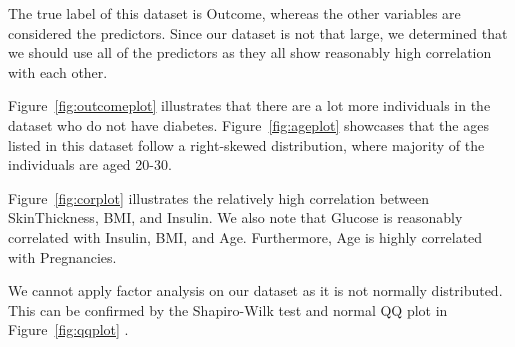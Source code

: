 \documentclass[12pt]{article}
\begin{document}
\begin{indent}
\onehalfspacing	
	
The true label of this dataset is Outcome, whereas the other variables are considered the predictors. Since our dataset is not that large, we determined that we should use all of the predictors as they all show reasonably high correlation with each other. 

Figure~\ref{fig:outcomeplot} illustrates that there are a lot more individuals in the dataset who do not have diabetes. Figure~\ref{fig:ageplot} showcases that the ages listed in this dataset follow a right-skewed distribution, where majority of the individuals are aged 20-30.

Figure~\ref{fig:corplot} illustrates the relatively high correlation between SkinThickness, BMI, and Insulin. We also note that Glucose is reasonably correlated with Insulin, BMI, and Age. Furthermore, Age is highly correlated with Pregnancies.

We cannot apply factor analysis on our dataset as it is not normally distributed. This can be confirmed by the Shapiro-Wilk test and normal QQ plot in Figure~\ref{fig:qqplot} \citep{Rlang}.
\end{indent}
\end{document}
